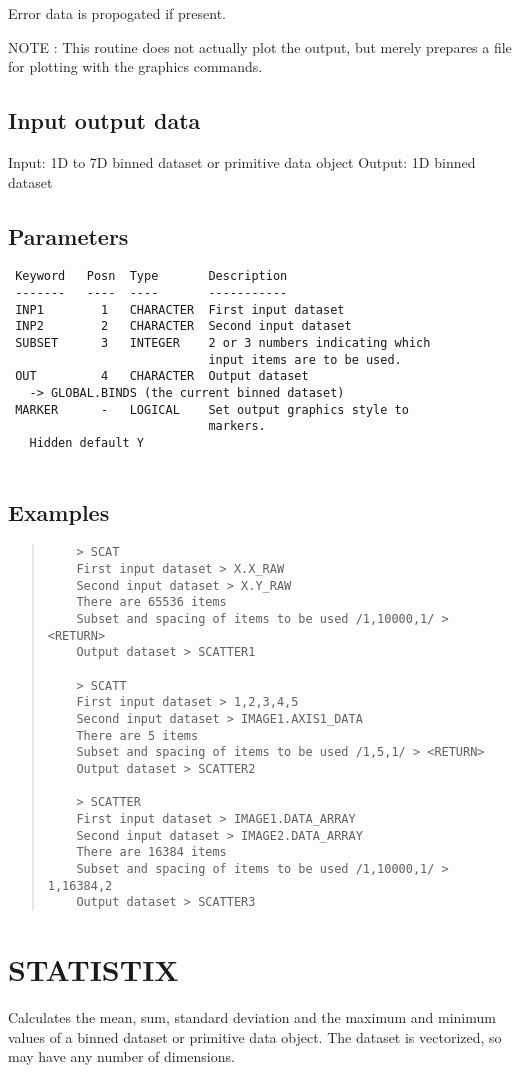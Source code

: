 \documentclass{book}
\renewcommand{\_}{{\tt\char'137}}     %
\begin{document}
Error data is propogated if present.
 
NOTE : This routine does not actually plot the output,
but merely prepares a file for plotting with the
graphics commands.
 
\subsection{Input output data}
Input: 1D to 7D binned dataset or primitive data object
Output: 1D binned dataset
\subsection{Parameters}
\begin{verbatim}
 Keyword   Posn  Type       Description
 -------   ----  ----       -----------
 INP1        1   CHARACTER  First input dataset
 INP2        2   CHARACTER  Second input dataset
 SUBSET      3   INTEGER    2 or 3 numbers indicating which
                            input items are to be used.
 OUT         4   CHARACTER  Output dataset
   -> GLOBAL.BINDS (the current binned dataset)
 MARKER      -   LOGICAL    Set output graphics style to
                            markers.
   Hidden default Y
 
\end{verbatim}\subsection{Examples}
\begin{quote}\begin{verbatim}
    > SCAT
    First input dataset > X.X_RAW
    Second input dataset > X.Y_RAW
    There are 65536 items
    Subset and spacing of items to be used /1,10000,1/ > <RETURN>
    Output dataset > SCATTER1
 
    > SCATT
    First input dataset > 1,2,3,4,5
    Second input dataset > IMAGE1.AXIS1_DATA
    There are 5 items
    Subset and spacing of items to be used /1,5,1/ > <RETURN>
    Output dataset > SCATTER2
 
    > SCATTER
    First input dataset > IMAGE1.DATA_ARRAY
    Second input dataset > IMAGE2.DATA_ARRAY
    There are 16384 items
    Subset and spacing of items to be used /1,10000,1/ > 1,16384,2
    Output dataset > SCATTER3
\end{verbatim}\end{quote}
\section{STATISTIX}
Calculates the mean, sum, standard deviation and the maximum and
minimum values of a binned dataset or primitive data object. The
dataset is vectorized, so may have any number of dimensions.
 
\end{document}

